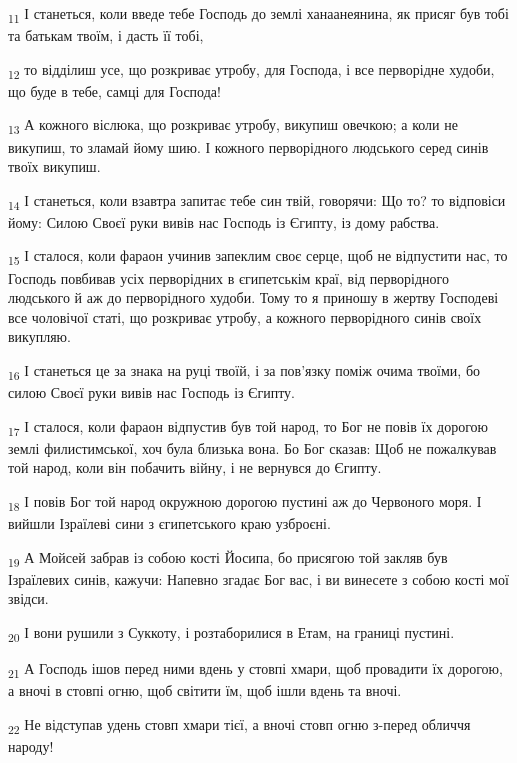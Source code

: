\begin{tcolorbox}
\textsubscript{11} І станеться, коли введе тебе Господь до землі ханаанеянина, як присяг був тобі та батькам твоїм, і дасть її тобі,
\end{tcolorbox}
\begin{tcolorbox}
\textsubscript{12} то відділиш усе, що розкриває утробу, для Господа, і все перворідне худоби, що буде в тебе, самці для Господа!
\end{tcolorbox}
\begin{tcolorbox}
\textsubscript{13} А кожного віслюка, що розкриває утробу, викупиш овечкою; а коли не викупиш, то зламай йому шию. І кожного перворідного людського серед синів твоїх викупиш.
\end{tcolorbox}
\begin{tcolorbox}
\textsubscript{14} І станеться, коли взавтра запитає тебе син твій, говорячи: Що то? то відповіси йому: Силою Своєї руки вивів нас Господь із Єгипту, із дому рабства.
\end{tcolorbox}
\begin{tcolorbox}
\textsubscript{15} І сталося, коли фараон учинив запеклим своє серце, щоб не відпустити нас, то Господь повбивав усіх перворідних в єгипетськім краї, від перворідного людського й аж до перворідного худоби. Тому то я приношу в жертву Господеві все чоловічої статі, що розкриває утробу, а кожного перворідного синів своїх викупляю.
\end{tcolorbox}
\begin{tcolorbox}
\textsubscript{16} І станеться це за знака на руці твоїй, і за пов'язку поміж очима твоїми, бо силою Своєї руки вивів нас Господь із Єгипту.
\end{tcolorbox}
\begin{tcolorbox}
\textsubscript{17} І сталося, коли фараон відпустив був той народ, то Бог не повів їх дорогою землі филистимської, хоч була близька вона. Бо Бог сказав: Щоб не пожалкував той народ, коли він побачить війну, і не вернувся до Єгипту.
\end{tcolorbox}
\begin{tcolorbox}
\textsubscript{18} І повів Бог той народ окружною дорогою пустині аж до Червоного моря. І вийшли Ізраїлеві сини з єгипетського краю узброєні.
\end{tcolorbox}
\begin{tcolorbox}
\textsubscript{19} А Мойсей забрав із собою кості Йосипа, бо присягою той закляв був Ізраїлевих синів, кажучи: Напевно згадає Бог вас, і ви винесете з собою кості мої звідси.
\end{tcolorbox}
\begin{tcolorbox}
\textsubscript{20} І вони рушили з Суккоту, і розтаборилися в Етам, на границі пустині.
\end{tcolorbox}
\begin{tcolorbox}
\textsubscript{21} А Господь ішов перед ними вдень у стовпі хмари, щоб провадити їх дорогою, а вночі в стовпі огню, щоб світити їм, щоб ішли вдень та вночі.
\end{tcolorbox}
\begin{tcolorbox}
\textsubscript{22} Не відступав удень стовп хмари тієї, а вночі стовп огню з-перед обличчя народу!
\end{tcolorbox}
